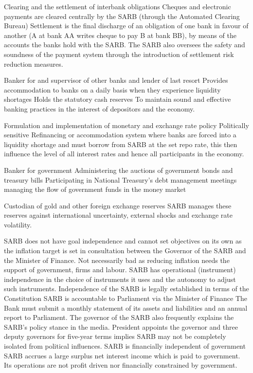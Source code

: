 \documentclass[12pt]{examnotes}
\begin{document}
 Clearing and the settlement of interbank obligations
\rna Cheques and electronic payments are cleared centrally by the SARB (through the Automated Clearing Bureau)
\rna Settlement is the final discharge of an obligation of one bank in favour of another (A at bank AA writes cheque to pay B at bank BB), by means of the accounts the banks hold with the SARB.
\rna The SARB also oversees the safety and soundness of the payment system through the introduction of settlement risk reduction measures.

 Banker for and supervisor of other banks and lender of last resort
\rna Provides accommodation to banks on a daily basis when they experience liquidity shortages 
\rna Holds the statutory cash reserves 
\rna To maintain sound and effective banking practices in the interest of depositors and the economy.

 Formulation and implementation of monetary and exchange rate policy
\rna Politically sensitive 
\rna Refinancing or accommodation system where banks are forced into a liquidity shortage and must borrow from SARB at the set repo rate, this then influence the level of all interest rates and hence all participants in the economy.
\rna 

 Banker for government
\rna Administering the auctions of government bonds and treasury bills
\rna Participating in National Treasury's debt management meetings 
\rna managing the flow of government funds in the money market

 Custodian of gold and other foreign exchange reserves
\ra SARB manages these reserves against international uncertainty, external shocks and exchange rate volatility.

\ra SARB does not have goal independence and cannot set objectives on its own as the inflation target is set in consultation between the Governor of the SARB and the Minister of Finance. Not necessarily bad as reducing inflation needs the support of government, firms and labour.
\ra SARB has operational (instrument) independence in the choice of instruments it uses and the autonomy to adjust such instruments.
\ra Independence of the SARB is legally established in terms of the Constitution
\ra SARB is accountable to Parliament via the Minister of Finance
\ra The Bank must submit a monthly statement of its assets and liabilities and an annual report to Parliament.
\ra The governor of the SARB also frequently explains the SARB's policy stance in the media.
\ra President appoints the governor and three deputy governors for five-year terms implies SARB may not be completely isolated from political influences.
\ra SARB is financially independent of government
\ra SARB accrues a large surplus net interest income which is paid to government. 
\ra Its operations are not profit driven nor financially constrained by government.
\end{document}
